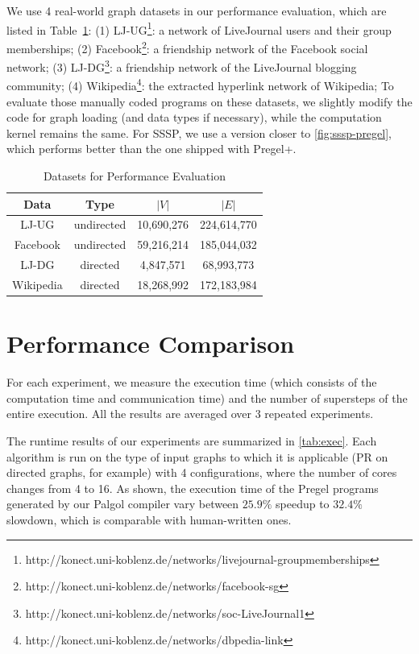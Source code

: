 \documentclass{sokendai_thesis} %
\begin{document}
We use 4 real-world graph datasets in our performance evaluation, which are listed in Table~\ref{tab:datasets}:
(1) LJ-UG\footnote{http://konect.uni-koblenz.de/networks/livejournal-groupmemberships}: a network of LiveJournal users and their group memberships;
(2) Facebook\footnote{http://konect.uni-koblenz.de/networks/facebook-sg}: a friendship network of the Facebook social network;
(3) LJ-DG\footnote{http://konect.uni-koblenz.de/networks/soc-LiveJournal1}: a friendship network of the LiveJournal blogging community;
(4) Wikipedia\footnote{http://konect.uni-koblenz.de/networks/dbpedia-link}: the extracted hyperlink network of Wikipedia;
To evaluate those manually coded programs on these datasets, we slightly modify the code for graph loading (and data types if necessary), while the computation kernel remains the same.
For SSSP, we use a version closer to \autoref{fig:sssp-pregel}, which performs better than the one shipped with Pregel+.

\begin{table}[t]
 \centering
 \caption{Datasets for Performance Evaluation}
 \label{tab:datasets}
 \begin{tabular}{|c|c|c|c|}
  \hline
  Data & Type & $|V|$ & $|E|$ \\
  \hline\hline
  LJ-UG & undirected & 10,690,276 & 224,614,770 \\
  \hline
  Facebook & undirected & 59,216,214 & 185,044,032 \\
  \hline
  LJ-DG & directed & 4,847,571 & 68,993,773 \\
  \hline
  Wikipedia & directed & 18,268,992 & 172,183,984 \\
  \hline
 \end{tabular}
\vspace{-2ex}\end{table}

\section{Performance Comparison}

For each experiment, we measure the execution time (which consists of the computation time and communication time) and the number of supersteps of the entire execution.
All the results are averaged over 3 repeated experiments.

The runtime results of our experiments are summarized in \autoref{tab:exec}.
Each algorithm is run on the type of input graphs to which it is applicable (PR on directed graphs, for example) with 4 configurations, where the number of cores changes from 4 to 16.
As shown, the execution time of the Pregel programs generated by our Palgol compiler vary between $25.9\%$ speedup to $32.4\%$ slowdown, which is comparable with human-written ones.
\end{document}
